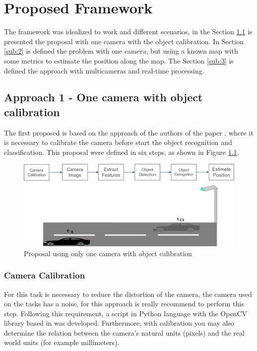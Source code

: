 
\chapter{Proposed Framework}
\label{capitulo4}
The framework was idealized to work and different scenarios, in the Section \ref{sub:1} is presented the proposal with one camera with the object calibration. In Section \ref{sub:2} is defined the problem with one camera, but using a known map with some metrics to estimate the position along the map. The Section \ref{sub:3} is defined the approach with multicameras and real-time processing. 



\section{Approach 1 - One camera with object calibration}\label{sub:1}

The first proposed is based on the approach of the authors of the paper \cite{8678911}, where it is necessary to calibrate the camera before start the object recognition and classification. This proposal were defined in six steps, as shown in Figure \ref{fig:proposal1}.

\begin{figure}[H]
\centering
\includegraphics[width=\textwidth]{imagens/proposal1.png}
\caption{Proposal using only one camera with object calibration}
\label{fig:proposal1}
\end{figure}

\subsection{Camera Calibration}

For this task is necessary to reduce the distortion of the camera, the camera used on the tasks has a noise, for this approach is really recommend to perform this step. Following this requirement, a script in Python language with the OpenCV library based in \cite{zhu2020camera} was developed. Furthermore, with calibration you may also determine the relation between the camera’s natural units (pixels) and the real world units (for example millimeters).

